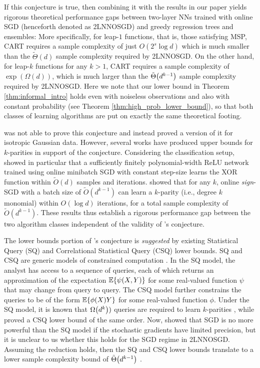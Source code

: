 \documentclass[11pt]{article}
\DeclarePairedDelimiter{\braces}{\lbrace}{\rbrace}
\DeclarePairedDelimiter{\paren}{(}{)}
\newcommand{\E}{\mathbb{E}}
\newcommand{\nfeats}{d}
\newcommand{\MSP}{\textsf{MSP}}
\begin{document}
If this conjecture is true, then combining it with the results in our paper yields rigorous theoretical performance gaps between two-layer NNs trained with online SGD (henceforth denoted as \textsf{2LNNOSGD}) and greedy regression trees and ensembles:
More specifically, for leap-$1$ functions, that is, those satisfying \MSP, CART requires a sample complexity of just $O(2^s\log\nfeats)$ which is much smaller than the $\tilde{\Theta}(\nfeats)$ sample complexity required by \textsf{2LNNOSGD}.
On the other hand, for leap-$k$ functions for any $k > 1$, CART requires a sample complexity of $\exp(\Omega(\nfeats))$, which is much larger than the $\tilde{\Theta}\paren*{\nfeats^{k-1}}$ sample complexity required by \textsf{2LNNOSGD}.
Here we note that our lower bound in Theorem \ref{thm:informal_intro} holds even with noiseless observations and also with constant probability (see Theorem \ref{thm:high_prob_lower_bound}), so that both classes of learning algorithms are put on exactly the same theoretical footing.

\cite{abbe2023sgd} was not able to prove this conjecture and instead proved a version of it for isotropic Gaussian data.
However, several works have produced upper bounds for $k$-parities in support of the conjecture.
Considering the classification setup, \cite{Glasgow2024sgd} showed in particular that a sufficiently finitely polynomial-width ReLU network trained using online minibatch SGD with constant step-size learns the XOR function within $\tilde{O}(\nfeats)$ samples and iterations.
\cite{kou2024matching} showed that for any $k$, online \emph{sign}-SGD with a batch size of $\tilde{O}(\nfeats^{k-1})$ can learn a $k$-parity (i.e., degree $k$ monomial) within $O(\log\nfeats)$ iterations, for a total sample complexity of $\tilde{O}(\nfeats^{k-1})$.
These results thus establish a rigorous performance gap between the two algorithm classes independent of the validity of \cite{abbe2023sgd}'s conjecture.

The lower bounds portion of \cite{abbe2023sgd}'s conjecture is \emph{suggested} by existing Statistical Query (SQ) and Correlational Statistical Query (CSQ) lower bounds.
SQ and CSQ are generic models of constrained computation \citep{kearns1998efficient,feldman2021statistical}.
In the SQ model, the analyst has access to a sequence of queries, each of which returns an approximation of the expectation $\E\braces*{\psi(\textbf{X}, Y)}$ for some real-valued function $\psi$ that may change from query to query. 
The CSQ model further constrains the queries to be of the form $\E\braces*{\phi(\textbf{X})Y}$ for some real-valued function $\phi$.
Under the SQ model, it is known that $\Omega\paren*{\nfeats^k})$ queries are required to learn $k$-parities \citep{barak2022hidden}, while \cite{abbe2023sgd} proved a CSQ lower bound of the same order.
Now, \cite{abbe2021power} showed that SGD is no more powerful than the SQ model if the stochastic gradients have limited precision, but it is unclear to us whether this holds for the SGD regime in \textsf{2LNNOSGD}.
Assuming the reduction holds, then the SQ and CSQ lower bounds translate to a lower sample complexity bound of $\tilde{\Theta}\paren*{\nfeats^{k-1}}$ \citep{kou2024matching}.
\end{document}

